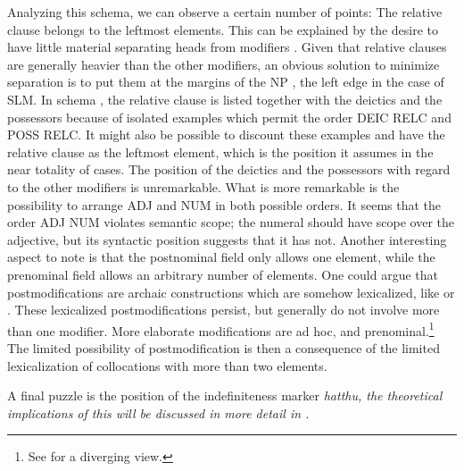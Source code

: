 Analyzing this schema, we can observe a certain number of points: The relative clause belongs to the leftmost elements. This can be explained by the desire to have little material separating heads from modifiers \citep{Hawkins1994}. Given that relative clauses are generally  heavier than the other modifiers, an obvious solution to minimize separation is to put them at the margins of the NP \citep[298f]{Rijkhoff2002}, the left edge in the case of SLM. In schema , the relative clause is listed together with the deictics and the possessors because of isolated examples which permit the order DEIC RELC and POSS RELC. It might also be possible to discount these examples and have the relative clause as the leftmost element, which is the position it assumes in the near totality of cases. The position of the deictics and the possessors with regard to the other modifiers is unremarkable. What is more remarkable is the possibility to arrange ADJ and NUM in both possible orders. It seems that the order ADJ NUM violates  semantic scope; the numeral should have scope over the adjective, but its syntactic position suggests that it has not. Another interesting aspect to note is that the postnominal field only allows one element, while the prenominal field allows an arbitrary number of elements. One could argue that postmodifications are archaic constructions which are somehow lexicalized, like  or . These lexicalized postmodifications persist, but generally do not involve more than one modifier. More elaborate modifications are ad hoc, and prenominal.\footnote{See \citet[53]{Saldin2001} for a diverging view.} The limited possibility of postmodification is then a consequence of the limited lexicalization of collocations with more than two elements.

A final puzzle is the position of the indefiniteness marker \em hatthu\em, the theoretical implications of this will be discussed in more detail in .



